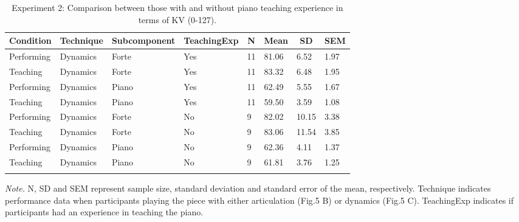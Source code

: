 \documentclass[
  man,floatsintext]{apa6}
\begin{document}
\begin{table}[tbp]

\begin{center}
\begin{threeparttable}

\caption{\label{tab:dyn-teaching-desc-2}Experiment 2: Comparison between those with and without piano teaching experience in terms of KV (0-127).}

\begin{tabular}{llllllll}
\toprule
Condition & \multicolumn{1}{c}{Technique} & \multicolumn{1}{c}{Subcomponent} & \multicolumn{1}{c}{TeachingExp} & \multicolumn{1}{c}{N} & \multicolumn{1}{c}{Mean} & \multicolumn{1}{c}{SD} & \multicolumn{1}{c}{SEM}\\
\midrule
Performing & Dynamics & Forte & Yes & 11 & 81.06 & 6.52 & 1.97\\
Teaching & Dynamics & Forte & Yes & 11 & 83.32 & 6.48 & 1.95\\
Performing & Dynamics & Piano & Yes & 11 & 62.49 & 5.55 & 1.67\\
Teaching & Dynamics & Piano & Yes & 11 & 59.50 & 3.59 & 1.08\\
Performing & Dynamics & Forte & No & 9 & 82.02 & 10.15 & 3.38\\
Teaching & Dynamics & Forte & No & 9 & 83.06 & 11.54 & 3.85\\
Performing & Dynamics & Piano & No & 9 & 62.36 & 4.11 & 1.37\\
Teaching & Dynamics & Piano & No & 9 & 61.81 & 3.76 & 1.25\\
\bottomrule
\addlinespace
\end{tabular}

\begin{tablenotes}[para]
\normalsize{\textit{Note.} N, SD and SEM represent sample size, standard deviation and standard error of the mean, respectively. Technique indicates performance data when participants playing the piece with either articulation (Fig.5 B) or dynamics (Fig.5 C). TeachingExp indicates if participants had an experience in teaching the piano.}
\end{tablenotes}

\end{threeparttable}
\end{center}

\end{table}
\end{document}
